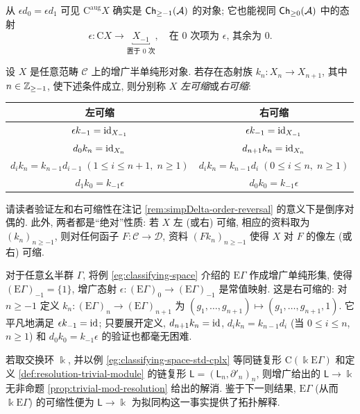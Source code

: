 从 $\epsilon d_0 = \epsilon d_1$ 可见 $\mathrm{C}^{\mathrm{aug}} X$ 确实是 $\mathsf{Ch}_{\geq -1}(\mathcal{A})$ 的对象; 它也能视同 $\mathsf{Ch}_{\geq 0}(\mathcal{A})$ 中的态射
\[ \epsilon: \mathrm{C} X \to \underbracket{X_{-1}}_{\text{置于 $0$ 次}}, \quad \text{在 $0$ 次项为 $\epsilon$, 其余为 $0$.} \]

\begin{definition}\label{def:contractible-aug}
	设 $X$ 是任意范畴 $\mathcal{C}$ 上的增广半单纯形对象. 若存在态射族 $k_n: X_n \to X_{n+1}$, 其中 $n \in \mathbb{Z}_{\geq -1}$, 使下述条件成立, 则分别称 $X$ \emph{左可缩}或\emph{右可缩}:
	\begin{center}\begin{tabular}{|c|c|} \hline
		左可缩 & 右可缩 \\ \hline
		$\epsilon k_{-1} = \mathrm{id}_{X_{-1}}$ & $\epsilon k_{-1} = \mathrm{id}_{X_{-1}}$ \\
		$d_0 k_n = \mathrm{id}_{X_n}$ & $d_{n+1} k_n = \mathrm{id}_{X_n}$ \\
		$d_i k_n = k_{n-1} d_{i-1}\; \left(1 \leq i \leq n+1, \; n \geq 1\right)$ & $d_i k_n = k_{n-1} d_i \; \left(0 \leq i \leq n, \; n \geq 1 \right)$ \\
		$d_1 k_0 = k_{-1} \epsilon$ & $d_0 k_0 = k_{-1} \epsilon$ \\ \hline
	\end{tabular}\end{center}
\end{definition}

请读者验证左和右可缩性在注记 \ref{rem:simpDelta-order-reversal} 的意义下是倒序对偶的. 此外, 两者都是``绝对''性质: 若 $X$ 左 (或右) 可缩, 相应的资料取为 $(k_n)_{n \geq -1}$, 则对任何函子 $F: \mathcal{C} \to \mathcal{D}$, 资料 $(Fk_n)_{n \geq -1}$ 使得 $X$ 对 $F$ 的像左 (或右) 可缩.

\begin{example}\label{eg:classifying-contractible}
	对于任意幺半群 $\Gamma$, 将例 \ref{eg:classifying-space} 介绍的 $\mathrm{E}\Gamma$ 作成增广单纯形集, 使得 $(\mathrm{E}\Gamma)_{-1} = \{1\}$, 增广态射 $\epsilon: (\mathrm{E}\Gamma)_0 \to (\mathrm{E}\Gamma)_{-1}$ 是常值映射. 这是右可缩的: 对 $n \geq -1$ 定义 $k_n: (\mathrm{E}\Gamma)_n \to (\mathrm{E}\Gamma)_{n+1}$ 为 $(g_1, \ldots, g_{n+1}) \mapsto (g_1, \ldots, g_{n+1}, 1)$. 它平凡地满足 $\epsilon k_{-1} = \mathrm{id}$; 只要展开定义, $d_{n+1} k_n = \mathrm{id}$, $d_i k_n = k_{n-1} d_i$ (当 $0 \leq i \leq n$, $n \geq 1$) 和 $d_0 k_0 = k_{-1} \epsilon$ 的验证也都毫无困难.
	
	若取交换环 $\Bbbk$, 并以例 \ref{eg:classifying-space-std-cplx} 等同链复形 $\mathrm{C}(\Bbbk\mathrm{E}\Gamma)$ 和定义 \ref{def:resolution-trivial-module} 的链复形 $\mathsf{L} = (\mathsf{L}_n, \partial'_n)_n$, 则增广给出的 $\mathsf{L} \to \Bbbk$ 无非命题 \ref{prop:trivial-mod-resolution} 给出的解消. 鉴于下一则结果, $\mathrm{E}\Gamma$ (从而 $\Bbbk\mathrm{E}\Gamma$) 的可缩性便为 $\mathsf{L} \to \Bbbk$ 为拟同构这一事实提供了拓扑解释.
\end{example}

